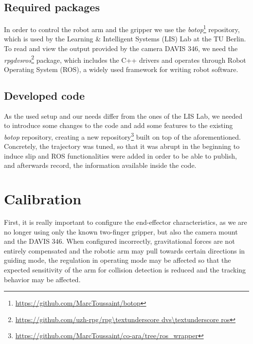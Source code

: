 \subsection{Required packages}

In order to control the robot arm and the gripper we use the \textit{botop}\footnote{\url{https://github.com/MarcToussaint/botop}} repository, which is used by the Learning \& Intelligent Systems (LIS) Lab at the TU Berlin.\\

To read and view the output provided by the camera DAVIS 346, we need the \textit{rpg\textunderscore dvs\textunderscore ros}\footnote{\url{https://github.com/uzh-rpg/rpg\textunderscore dvs\textunderscore ros}} package, which includes the C++ drivers and operates through Robot Operating System (ROS), a widely used framework for writing robot software.

\subsection{Developed code}

As the used setup and our needs differ from the ones of the LIS Lab, we needed to introduce some changes to the code and add some features to the existing \textit{botop} repository, creating a new repository\footnote{\url{https://github.com/MarcToussaint/co-ara/tree/ros_wrapper}} built on top of the aforementioned. Concretely, the trajectory was tuned, so that it was abrupt in the beginning to induce slip and ROS functionalities were added in order to be able to publish, and afterwards record, the information available inside the code.

\section{Calibration}

First, it is really important to configure the end-effector characteristics, as we are no longer using only the known two-finger gripper, but also the camera mount and the DAVIS 346. When configured incorrectly, gravitational forces are not entirely compensated and the robotic arm may pull towards certain directions in guiding mode, the regulation in operating mode may be affected so that the expected sensitivity of the arm for collision detection is reduced and the tracking behavior may be affected.\\

